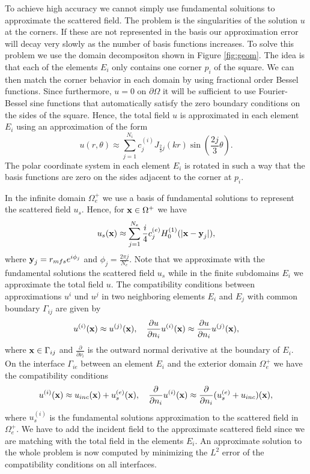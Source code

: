To achieve high accuracy we cannot simply use fundamental soluitions
to approximate the scattered field. The problem is the singularities
of the solution $u$ at the corners. If these are not represented in
the basis our approximation error will decay very slowly as the number
of basis functions increases. To solve this problem we use the domain
decompositon shown in Figure \ref{fig:geom}. The idea is that each of
the elements $E_i$ only contains one corner $p_i$ of the square. We can then
match the corner behavior in each domain by using fractional order
Bessel functions. Since furthermore, $u=0$ on $\partial\Omega$ it will
be sufficient to use Fourier-Bessel sine functions that automatically
satisfy the zero boundary conditions on the sides of the square.
Hence, the total field $u$ is approximated in each element $E_i$ using
an approximation of the form
$$
u(r,\theta)\approx
\sum_{j=1}^{N_i}c_j^{(i)}J_{\frac{2}{3}j}(kr)\sin(\frac{2j}{3}\theta).
$$
The polar coordinate system in each element $E_i$ is rotated in such a way
that the basis functions are zero on the sides adjacent to the corner
at $p_i$.

In the infinite domain $\Omega_e^+$ we use a basis of fundamental
solutions to represent the scattered field $u_s$. Hence, for
$\textbf{x}\in\Omega^+$ we have
$$
u_s(\textbf{x})\approx \sum_{j=1}^{N_e}\frac{i}{4}c_j^{(e)}H_0^{(1)}(|\textbf{x}-\textbf{y}_j|),
$$
where $\textbf{y}_j=r_{mfs}e^{i\phi_j}$ and $\phi_j=\frac{2\pi j}{N_e}$. Note
that we approximate with the fundamental solutions the scattered field
$u_s$ while in the finite subdomains $E_i$ we approximate the total
field $u$. The compatibility conditions between approximations $u^{i}$
und $u^{j}$ in two neighboring elements $E_i$ and $E_j$ with common
boundary $\Gamma_{ij}$ are given by
$$
u^{(i)}(\textbf{x})\approx u^{(j)}(\textbf{x}),\quad \frac{\partial u}{\partial
  n_i}{u^{(i)}}(\textbf{x})\approx  \frac{\partial u}{\partial
  n_i}{u^{(j)}}(\textbf{x}),
$$
where $\textbf{x}\in\Gamma_{ij}$ and $\frac{\partial}{\partial\nu_i}$ is the
outward normal derivative at the boundary of $E_i$.
On the interface $\Gamma_{ie}$ between an element $E_i$ and the
exterior domain $\Omega_e^{+}$ we have the compatibility conditions
$$
u^{(i)}(\textbf{x})\approx u_{inc}(\textbf{x})+u_s^{(e)}(\textbf{x}),\quad \frac{\partial}{\partial
  n_i}{u^{(i)}}(\textbf{x})\approx  \frac{\partial}{\partial
  n_i}{(u_s^{(e)}+u_{inc})}(\textbf{x}),
$$
where $u_s^{(i)}$ is the fundamental solutions approximation to the
scattered field in $\Omega_e^{+}$. We have to add the incident field
to the approximate scattered field since we are matching with the
total field in the elements $E_i$.
An approximate solution to the whole problem is now 
computed by minimizing the $L^2$ error of 
the compatibility conditions on all interfaces.

